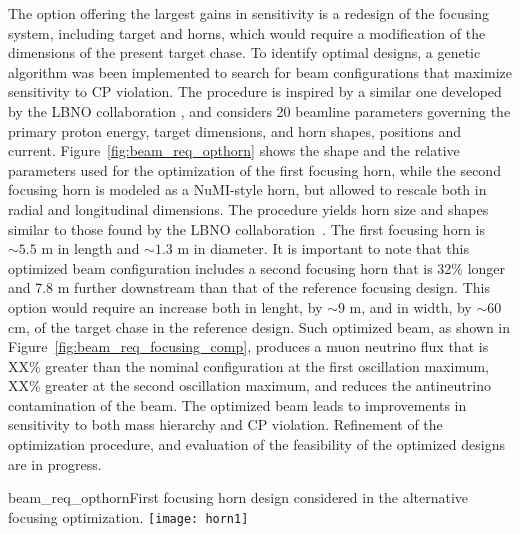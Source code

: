 The option offering the largest gains in sensitivity is a redesign of the focusing system, including target and horns, which would require a modification of the dimensions
of the present target chase.  To identify optimal designs, a genetic algorithm was been implemented to search for beam configurations that maximize sensitivity to CP violation.
The procedure is inspired by a similar one developed by the LBNO collaboration , and considers 20 beamline parameters governing the primary proton energy, target dimensions, 
and horn shapes, positions and current. Figure~\ref{fig:beam_req_opthorn} shows the shape and the relative parameters used for the optimization of the first focusing horn, 
while the second focusing horn is modeled as a NuMI-style horn, but allowed to rescale both in radial and longitudinal dimensions. The procedure yields horn size and shapes 
similar to those found by the LBNO collaboration~\cite{LBNO}. The first focusing horn is $\sim 5.5$ m in length and $\sim 1.3$ m in diameter. It is important to note that this 
optimized beam configuration includes a second focusing horn that is 32\% longer and 7.8 m further downstream than that of the reference focusing design.  This option would 
require an increase both in lenght, by $\sim 9$ m, and in width, by $\sim 60$ cm, of the target chase in the reference design.  Such optimized beam, as shown in 
Figure~\ref{fig:beam_req_focusing_comp}, produces a muon neutrino flux that is XX\% greater than the nominal configuration at the first oscillation maximum, 
XX\% greater at the second oscillation maximum, and reduces the antineutrino contamination of the beam. The optimized beam leads to improvements in sensitivity to both mass hierarchy 
and CP violation. Refinement of the optimization procedure, and evaluation of the feasibility of the optimized designs are in progress. 

\begin{cdrfigure}{beam_req_opthorn}{First focusing horn design considered 
    in the alternative focusing optimization. 
}
  \texttt{[image: horn1]}
\end{cdrfigure}


